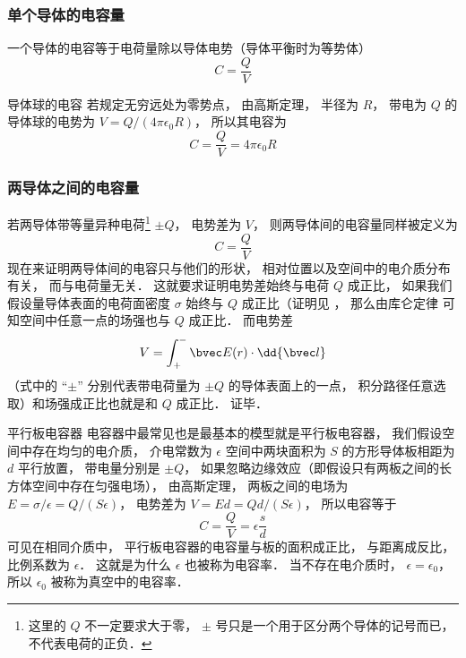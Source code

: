 

\subsubsection{单个导体的电容量}

一个导体的电容等于电荷量除以导体电势（导体平衡时为等势体）
\begin{equation}
C = \frac{Q}{V}
\end{equation}

\begin{example}{导体球的电容}\label{Cpctor_ex1}
若规定无穷远处为零势点， 由高斯定理， 半径为 $R$， 带电为 $Q$ 的导体球的电势为 $V = Q/(4\pi\epsilon_0 R)$， 所以其电容为
\begin{equation}\label{Cpctor_eq1}
C = \frac{Q}{V} = 4\pi\epsilon_0 R
\end{equation}
\end{example}


\subsubsection{两导体之间的电容量}
若两导体带等量异种电荷\footnote{这里的 $Q$ 不一定要求大于零， $\pm$ 号只是一个用于区分两个导体的记号而已， 不代表电荷的正负．} $\pm Q$， 电势差为 $V$， 则两导体间的电容量同样被定义为
\begin{equation}
C = \frac{Q}{V}
\end{equation}
现在来证明两导体间的电容只与他们的形状， 相对位置以及空间中的电介质分布有关， 而与电荷量无关． 这就要求证明电势差始终与电荷 $Q$ 成正比， 如果我们假设量导体表面的电荷面密度 $\sigma$ 始终与 $Q$ 成正比（证明见%
， 那么由库仑定律%
可知空间中任意一点的场强也与 $Q$ 成正比． 而电势差
\begin{equation}
V = \int_+^- \bvec E(r) \cdot \dd{\bvec l}
\end{equation}
（式中的 “$\pm$” 分别代表带电荷量为 $\pm Q$ 的导体表面上的一点， 积分路径任意选取）和场强成正比也就是和 $Q$ 成正比． 证毕．

\begin{example}{平行板电容器}\label{Cpctor_ex2}
电容器中最常见也是最基本的模型就是平行板电容器， 我们假设空间中存在均匀的电介质， 介电常数为 $\epsilon$ 空间中两块面积为 $S$ 的方形导体板相距为 $d$ 平行放置， 带电量分别是 $\pm Q$， 如果忽略边缘效应（即假设只有两板之间的长方体空间中存在匀强电场）， 由高斯定理，%
两板之间的电场为 $E = {\sigma}/{\epsilon} = Q/(S\epsilon)$， 电势差为 $V = Ed = Qd/(S\epsilon)$， 所以电容等于
\begin{equation}\label{Cpctor_eq4}
C = \frac{Q}{V} = \epsilon \frac sd
\end{equation}
可见在相同介质中， 平行板电容器的电容量与板的面积成正比， 与距离成反比， 比例系数为 $\epsilon$． 这就是为什么 $\epsilon$ 也被称为电容率． 当不存在电介质时， $\epsilon = \epsilon_0$， 所以 $\epsilon_0$ 被称为真空中的电容率．
\end{example}

